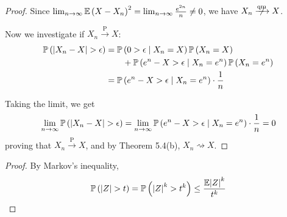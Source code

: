 \documentclass[a4paper]{article}
\begin{document}
\begin{proof}[Proof]
Since \(\lim_{n \to \infty} \mathbb{E}\left( X - X_{n} \right)^{2} = \lim_{n \to \infty} \frac{e^{2n}}{n} \neq 0 \), we have \(X_{n} \centernot{\xrightarrow{\text{qm}}} X \). 

Now we investigate if \(X_{n} \xrightarrow{\text{ P }} X\):
\begin{align*}
	\Prob\left( \abs{X_{n} - X} > \epsilon  \right) & = \Prob\left( 0 > \epsilon \mid X_{n} = X \right) \Prob\left( X_{n} = X \right) \\
	 & \qquad + \Prob\left( e^{n} - X > \epsilon \mid X_{n} = e^{n} \right) \Prob\left( X_{n} = e^{n} \right) \\
	 & = \Prob\left( e^{n} - X > \epsilon \mid X_{n} = e^{n} \right) \cdot \frac{1}{n} \\ 
\end{align*}

Taking the limit, we get
\[
	\lim_{n \to \infty} \Prob\left( \abs{X_{n} - X} > \epsilon  \right) = \lim_{n \to \infty} \Prob\left( e^{n} - X > \epsilon \mid X_{n} = e^{n} \right) \cdot \frac{1}{n} = 0
\]
proving that \(X_{n} \xrightarrow{\text{ P }} X\), and by Theorem 5.4(b), \(X_{n} \rightsquigarrow X\).
\end{proof}

\newpage

\begin{proof}[Proof] 
By Markov's inequality,
\[
	\Prob\left( \abs{Z} > t \right) = \Prob\left( \abs{Z}^{k} > t^{k} \right) \le \frac{\E \abs{Z}^{k}}{t^{k}}
\]
\end{proof}

\end{document}
